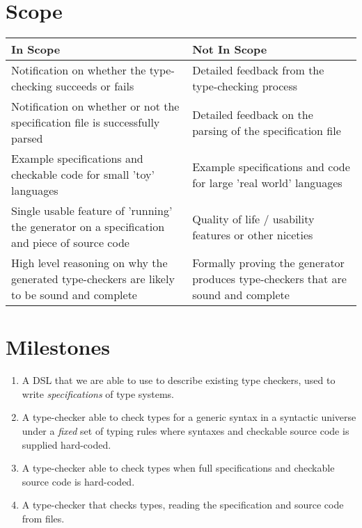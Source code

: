 \documentclass{ProgressReport}[2020/09/15]
\begin{document}
          \section{Scope}

          \begin{center}
          \begin{tabular}{p{20em}|p{18em}}
            \large In Scope & \large Not In Scope \\ \hline \hline
            Notification on whether the type-checking succeeds
            or fails
            & Detailed feedback from the type-checking process \\ \hline
            Notification on whether or not the specification file is
            successfully parsed
            & Detailed feedback on the parsing of the specification file \\ \hline
            Example specifications and checkable code for small 'toy' languages
            & Example specifications and code for large 'real world' languages \\ \hline
            Single usable feature of 'running' the generator on a
            specification and piece of source code
            & Quality of life / usability features or other niceties \\ \hline
            High level reasoning on why the generated type-checkers
            are likely to be sound and complete
            & Formally proving the generator produces type-checkers
            that are sound and complete\\
          \end{tabular}            
          \end{center}        
          
          \section{Milestones}

          \begin{enumerate}
          \item A DSL that we are able to use to describe existing
            type checkers, used to write \emph{specifications} of type systems.
          \item A type-checker able to check types for a generic syntax
            in a syntactic universe under a \emph{fixed} set of typing rules
            where syntaxes and checkable source code is supplied hard-coded.
          \item A type-checker able to check types when full specifications
            and checkable source code is hard-coded.
          \item A type-checker  that checks types, reading
            the specification and source code from files.
          \end{enumerate}
          
\end{document}
